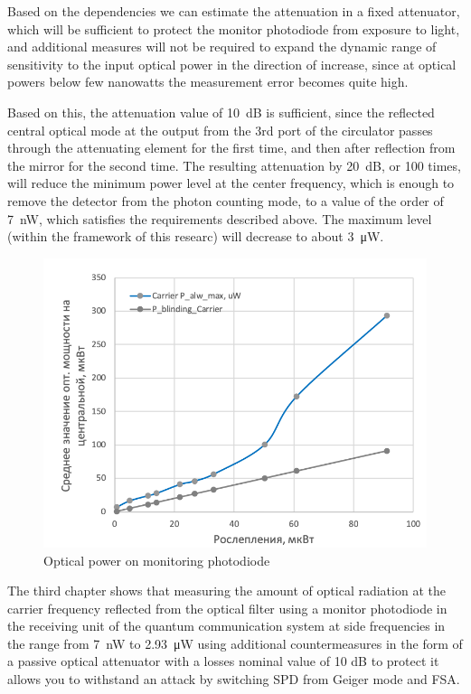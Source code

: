 Based on the dependencies we can estimate the attenuation in a fixed attenuator, which will be sufficient to protect the monitor photodiode from exposure to light, and additional measures will not be required to expand the dynamic range of sensitivity to the input optical power in the direction of increase, since at optical powers below few nanowatts the measurement error becomes quite high.

Based on this, the attenuation value of 10~dB is sufficient, since the reflected central optical mode at the output from the 3rd port of the circulator passes through the attenuating element for the first time, and then after reflection from the mirror for the second time. The resulting attenuation by 20~dB, or 100 times, will reduce the minimum power level at the center frequency, which is enough to remove the detector from the photon counting mode, to a value of the order of 7~nW, which satisfies the requirements described above. The maximum level (within the framework of this researc) will decrease to about 3~μW.


 \begin{figure}[ht]
  \centering
  \includegraphics[scale=0.5]{images/Watchdog_photodiode.png}
  \caption{Optical power on monitoring photodiode}
  \label{fig:Watchdog_photodiode}
\end{figure}


The third chapter shows that measuring the amount of optical radiation at the carrier frequency reflected from the optical filter using a monitor photodiode in the receiving unit of the quantum communication system at side frequencies in the range from 7~nW to 2.93~μW using additional countermeasures in the form of a passive optical attenuator with a losses nominal value of 10 dB to protect it allows you to withstand an attack by switching SPD from Geiger mode and FSA.

